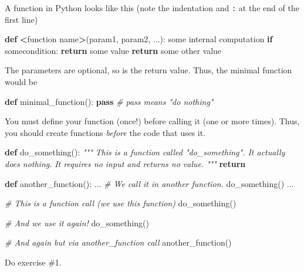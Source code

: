 \documentclass[
]{book}
\newenvironment{Shaded}{\begin{snugshade}}{\end{snugshade}}
\newcommand{\CommentTok}[1]{\textcolor[rgb]{0.56,0.35,0.01}{\textit{#1}}}
\newcommand{\ControlFlowTok}[1]{\textcolor[rgb]{0.13,0.29,0.53}{\textbf{#1}}}
\newcommand{\KeywordTok}[1]{\textcolor[rgb]{0.13,0.29,0.53}{\textbf{#1}}}
\newcommand{\NormalTok}[1]{#1}
\newcommand{\OperatorTok}[1]{\textcolor[rgb]{0.81,0.36,0.00}{\textbf{#1}}}
\begin{document}
A function in Python looks like this (note the indentation and \texttt{:} at the end of the first line)

\begin{Shaded}
\begin{Highlighting}[]
\KeywordTok{def} \OperatorTok{\textless{}}\NormalTok{function name}\OperatorTok{\textgreater{}}\NormalTok{(param1, param2, ...):}
\NormalTok{    some internal computation}
    \ControlFlowTok{if}\NormalTok{ somecondition:}
        \ControlFlowTok{return}\NormalTok{ some value}
    \ControlFlowTok{return}\NormalTok{ some other value}
\end{Highlighting}
\end{Shaded}

The parameters are optional, so is the return value. Thus, the minimal function would be

\begin{Shaded}
\begin{Highlighting}[]
\KeywordTok{def}\NormalTok{ minimal\_function():}
    \ControlFlowTok{pass} \CommentTok{\# pass means "do nothing"}
\end{Highlighting}
\end{Shaded}

You must define your function (once!) before calling it (one or more times). Thus, you should create functions \emph{before} the code that uses it.

\begin{Shaded}
\begin{Highlighting}[]
\KeywordTok{def}\NormalTok{ do\_something():}
    \CommentTok{"""}
\CommentTok{    This is a function called "do\_something". It actually does nothing.}
\CommentTok{    It requires no input and returns no value.}
\CommentTok{    """}
    \ControlFlowTok{return}
    
\KeywordTok{def}\NormalTok{ another\_function():}
\NormalTok{    ...}
    \CommentTok{\# We call it in another function.}
\NormalTok{    do\_something()}
\NormalTok{    ...}

\CommentTok{\# This is a function call (we use this function)}
\NormalTok{do\_something()}

\CommentTok{\# And we use it again!}
\NormalTok{do\_something()}

\CommentTok{\# And again but via another\_function call}
\NormalTok{another\_function()}
\end{Highlighting}
\end{Shaded}

Do exercise \#1.
\end{document}

